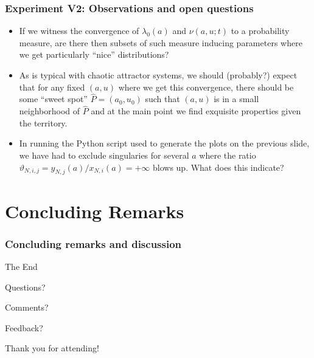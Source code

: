 \documentclass[usenames,svgnames,dvipsnames,10pt]{beamer}
\begin{document}
\begin{frame}
\frametitle{Experiment V2: Observations and open questions}

\begin{itemize} 

\item If we witness the convergence of $\lambda_0(a)$ and $\nu(a, u; t)$ to a probability measure, 
      are there then subsets of such 
      measure inducing parameters where we get particularly ``nice'' distributions? 
\item As is typical with chaotic attractor systems, we should (probably?) expect that for any 
      fixed $(a, u)$ where we get this convergence, there should be some 
      ``sweet spot'' $\widehat{P} = (a_0, u_0)$ such that $(a, u)$ is in a small neighborhood of 
      $\widehat{P}$ and at the main point we find exquisite properties given the territory. 
\item In running the Python script used to generate the plots on the previous slide, 
      we have had to exclude singularies for several $a$ where the ratio 
      $\vartheta_{N,i,j} = y_{N,j}(a) / x_{N,i}(a) = +\infty$ blows up. What does this indicate? 

\end{itemize}

\end{frame}

\section{Concluding Remarks} 

\begin{frame}
\frametitle{Concluding remarks and discussion} 

     \Huge{\centerline{The End}}\smallskip
     \Large{\centerline{Questions?}}\smallskip
     \Large{\centerline{Comments?}}\smallskip
     \Large{\centerline{Feedback?}}\bigskip
     \Huge{\centerline{Thank you for attending!}} 

\end{frame}
\end{document}
